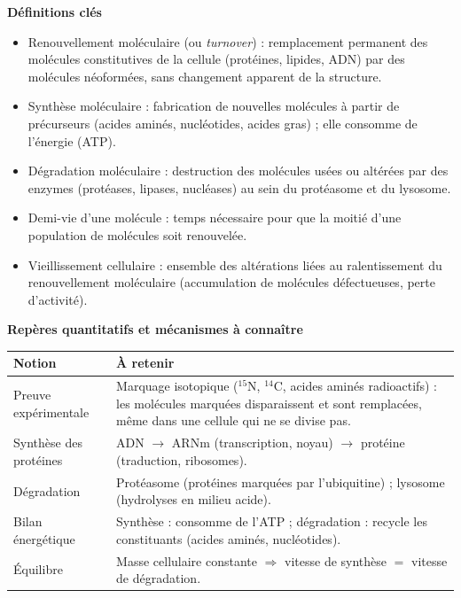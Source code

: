 \documentclass[11pt]{article}
\newcommand{\cle}[1]{{\popxbold\color{popdark}#1}}
\begin{document}
\begin{bilan}
\textbf{Définitions clés}
\begin{itemize}
  \item \cle{Renouvellement moléculaire} (ou \emph{turnover}) : remplacement permanent des molécules constitutives de la cellule (protéines, lipides, ADN) par des molécules néoformées, sans changement apparent de la structure.
  \item \cle{Synthèse moléculaire} : fabrication de nouvelles molécules à partir de précurseurs (acides aminés, nucléotides, acides gras) ; elle consomme de l'énergie (ATP).
  \item \cle{Dégradation moléculaire} : destruction des molécules usées ou altérées par des enzymes (protéases, lipases, nucléases) au sein du \cle{protéasome} et du \cle{lysosome}.
  \item \cle{Demi-vie} d'une molécule : temps nécessaire pour que la moitié d'une population de molécules soit renouvelée.
  \item \cle{Vieillissement cellulaire} : ensemble des altérations liées au ralentissement du renouvellement moléculaire (accumulation de molécules défectueuses, perte d'activité).
\end{itemize}

\textbf{Repères quantitatifs et mécanismes à connaître}
\begin{center}
\begin{tabularx}{\linewidth}{|l|X|}
\hline
\rowcolor{popblueL} \textbf{Notion} & \textbf{À retenir} \\
\hline
Preuve expérimentale & Marquage isotopique ($^{15}$N, $^{14}$C, acides aminés radioactifs) : les molécules marquées disparaissent et sont remplacées, même dans une cellule qui ne se divise pas. \\
\hline
Synthèse des protéines & ADN $\rightarrow$ ARNm (transcription, noyau) $\rightarrow$ protéine (traduction, ribosomes). \\
\hline
Dégradation & Protéasome (protéines marquées par l'ubiquitine) ; lysosome (hydrolyses en milieu acide). \\
\hline
Bilan énergétique & Synthèse : consomme de l'ATP ; dégradation : recycle les constituants (acides aminés, nucléotides). \\
\hline
Équilibre & Masse cellulaire constante $\Rightarrow$ vitesse de synthèse $=$ vitesse de dégradation. \\
\hline
\end{tabularx}
\end{center}


\end{bilan}
\end{document}
